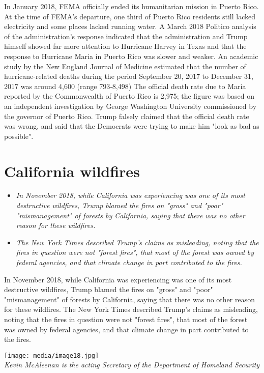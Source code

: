 In January 2018, FEMA officially ended its humanitarian mission in
Puerto Rico. At the time of FEMA's departure, one third of Puerto Rico
residents still lacked electricity and some places lacked running water.
A March 2018 Politico analysis of the administration's response
indicated that the administration and Trump himself showed far more
attention to Hurricane Harvey in Texas and that the response to
Hurricane Maria in Puerto Rico was slower and weaker. An academic study
by the New England Journal of Medicine estimated that the number of
hurricane-related deaths during the period September 20, 2017 to
December 31, 2017 was around 4,600 (range 793-8,498) The official death
rate due to Maria reported by the Commonwealth of Puerto Rico is 2,975;
the figure was based on an independent investigation by George
Washington University commissioned by the governor of Puerto Rico. Trump
falsely claimed that the official death rate was wrong, and said that
the Democrats were trying to make him "look as bad as possible".

\section{California wildfires}\label{california-wildfires}

\begin{itemize}
\item
  \emph{In November 2018, while California was experiencing was one of
  its most destructive wildfires, Trump blamed the fires on "gross" and
  "poor" "mismanagement" of forests by California, saying that there was
  no other reason for these wildfires.}
\item
  \emph{The New York Times described Trump's claims as misleading,
  noting that the fires in question were not "forest fires", that most
  of the forest was owned by federal agencies, and that climate change
  in part contributed to the fires.}
\end{itemize}

In November 2018, while California was experiencing was one of its most
destructive wildfires, Trump blamed the fires on "gross" and "poor"
"mismanagement" of forests by California, saying that there was no other
reason for these wildfires. The New York Times described Trump's claims
as misleading, noting that the fires in question were not "forest
fires", that most of the forest was owned by federal agencies, and that
climate change in part contributed to the fires.

\texttt{[image: media/image18.jpg]}\\
\emph{Kevin McAleenan is the acting Secretary of the Department of
Homeland Security}

